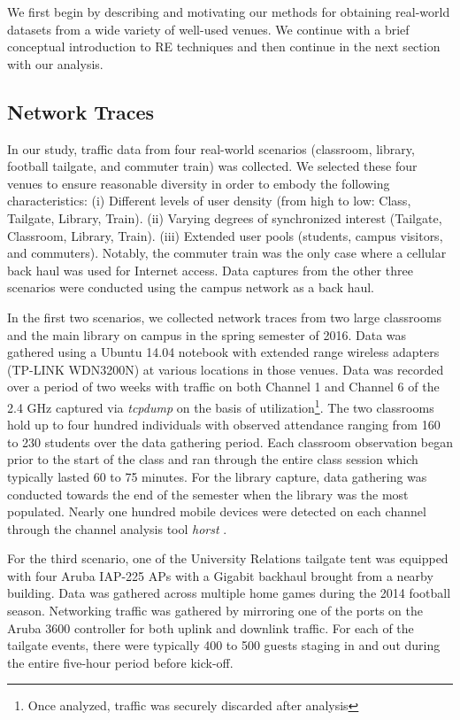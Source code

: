 \documentclass{sig-alternate}
\begin{document}
We first begin by describing and motivating our methods for obtaining real-world datasets from a wide variety of well-used venues. We continue with a brief conceptual introduction to RE techniques and then continue in the next section with our analysis.  

\subsection{Network Traces}

In our study, traffic data from four real-world scenarios (classroom, library, football tailgate, and commuter train) was collected. We selected these four venues to ensure reasonable diversity in order to embody the following characteristics: (i) Different levels of user density (from high to low: Class, Tailgate, Library, Train). (ii) Varying degrees of synchronized interest (Tailgate, Classroom, Library, Train). (iii) Extended user pools (students, campus visitors, and commuters). Notably, the commuter train was the only case where a cellular back haul was used for Internet access. Data captures from the other three scenarios were conducted using the campus network as a back haul. 

In the first two scenarios, we collected network traces from two large classrooms and the main library on campus in the spring semester of 2016. Data was gathered using a Ubuntu 14.04 notebook with extended range wireless adapters (TP-LINK WDN3200N) at various locations in those venues. Data was recorded over a period of two weeks with traffic on both Channel 1 and Channel 6 of the 2.4 GHz captured via \emph{tcpdump} on the basis of utilization\footnote{Once analyzed, traffic was securely discarded after analysis}. The two classrooms hold up to four hundred individuals with observed attendance ranging from 160 to 230 students over the data gathering period. Each classroom observation began prior to the start of the class and ran through the entire class session which typically lasted 60 to 75 minutes. For the library capture, data gathering was conducted towards the end of the semester when the library was the most populated. Nearly one hundred mobile devices were detected on each channel through the channel analysis tool \emph{horst} \cite{horst}.    

For the third scenario, one of the University Relations tailgate tent was equipped with four Aruba IAP-225 APs with a Gigabit backhaul brought from a nearby building. Data was gathered across multiple home games during the 2014 football season. Networking traffic was gathered by mirroring one of the ports on the Aruba 3600 controller for both uplink and downlink traffic. For each of the tailgate events, there were typically 400 to 500 guests staging in and out during the entire five-hour period before kick-off.  
\end{document}
